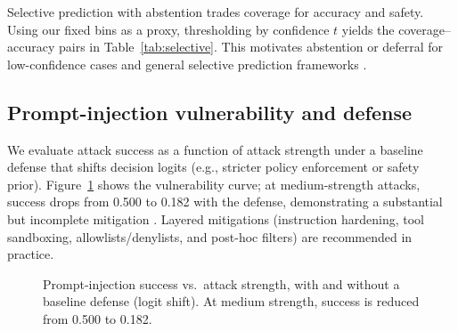 \documentclass[10pt]{article}
\begin{document}
Selective prediction with abstention trades coverage for accuracy and safety. Using our fixed bins as a proxy, thresholding by confidence $t$ yields the coverage–accuracy pairs in Table~\ref{tab:selective}. This motivates abstention or deferral for low-confidence cases \citep{Kadavath2022KnowWhatKnow} and general selective prediction frameworks \citep{Geifman2017Selective}.

\begin{table}[ht]
\centering
\caption{Selective prediction via confidence threshold $t$: coverage and accuracy among covered predictions (deterministic from the fixed-bin simulation).}
\vspace{0.5em}
\label{tab:selective}
\end{table}

\subsection{Prompt-injection vulnerability and defense}
We evaluate attack success as a function of attack strength under a baseline defense that shifts decision logits (e.g., stricter policy enforcement or safety prior). Figure~\ref{fig:attack} shows the vulnerability curve; at medium-strength attacks, success drops from 0.500 to 0.182 with the defense, demonstrating a substantial but incomplete mitigation \citep{Perez2022RedTeam, Greshake2023IndirectPromptInjection, Zou2023UniversalJailbreaks}. Layered mitigations (instruction hardening, tool sandboxing, allowlists/denylists, and post-hoc filters) are recommended in practice.

\begin{figure}[ht]
\centering
{}
\vspace{0.5em}
\caption{Prompt-injection success vs.\ attack strength, with and without a baseline defense (logit shift). At medium strength, success is reduced from 0.500 to 0.182.}
\label{fig:attack}
\end{figure}
\end{document}
